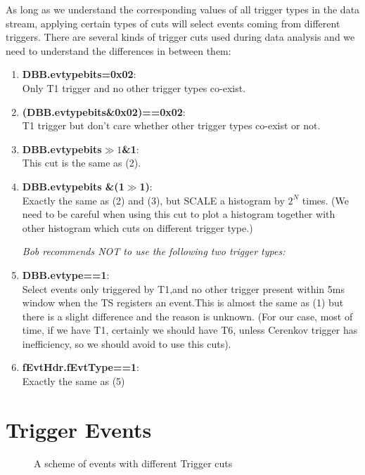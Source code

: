 \documentclass[a4paper,10.5pt]{article}
\begin{document}
 As long as we understand the corresponding values of all trigger types in the data stream, applying certain types of cuts will select events coming from different triggers. There are several kinds of trigger cuts used during data analysis and we need to understand the differences in between them:
 \begin{enumerate}
\item \textbf{DBB.evtypebits=0x02}: \\
 Only T1 trigger and no other trigger types co-exist.
\item \textbf{(DBB.evtypebits\&0x02)==0x02}: \\
    T1 trigger but don't care whether other trigger types co-exist or not.
\item \textbf{DBB.evtypebits$\gg1$\&1}: \\
    This cut is the same as (2).
\item \textbf{DBB.evtypebits \&(1$\gg$1)}: \\
    Exactly the same as (2) and (3), but SCALE a histogram by $2^{N}$ times. (We need to be careful when using this cut to plot a histogram together with other histogram which cuts on different trigger type.)

\emph{Bob recommends NOT to use the following two trigger types:}
\item \textbf{DBB.evtype==1}: \\
     Select events only triggered by T1,and no other trigger present within 5ms window when the TS registers an event.This is almost the same as (1) but there is a slight difference and the reason is unknown. (For our case, most of time, if we have T1, certainly we should have T6, unless Cerenkov trigger has inefficiency, so we should avoid to use this cuts).
\item \textbf{fEvtHdr.fEvtType==1}:\\
     Exactly the same as (5)
\end{enumerate}

\section{Trigger Events}

\begin{figure}[htb]
\centerline{}
\caption[A scheme of events with different Trigger cuts]{\footnotesize{A scheme of events with different Trigger cuts}
\label{trig_region}}
\end{figure}
\end{document}
